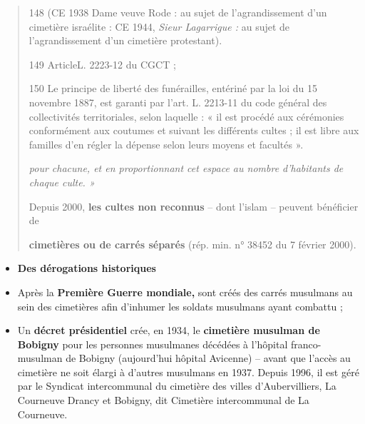 \begin{quote}
148 (CE 1938 Dame veuve Rode : au sujet de l'agrandissement d'un
cimetière israélite : CE 1944, \emph{Sieur Lagarrigue :} au sujet de
l'agrandissement d'un cimetière protestant).

149 ArticleL. 2223-12 du CGCT ;

150 Le principe de liberté des funérailles, entériné par la loi du 15
novembre 1887, est garanti par l'art. L. 2213-11 du code général des
collectivités territoriales, selon laquelle : « il est procédé aux
cérémonies conformément aux coutumes et suivant les différents cultes ;
il est libre aux familles d'en régler la dépense selon leurs moyens et
facultés ».



\emph{pour chacune, et en proportionnant cet espace au nombre
d'habitants de chaque culte. »}

Depuis 2000, \textbf{les cultes non reconnus} -- dont l'islam -- peuvent
bénéficier de

\textbf{cimetières ou de carrés séparés} (rép. min. n° 38452 du 7
février 2000).
\end{quote}

\begin{itemize}
\item
  \textbf{Des dérogations historiques}
\end{itemize}

\begin{itemize}
\item
  Après la \textbf{Première Guerre mondiale,} sont créés des carrés
  musulmans au sein des cimetières afin d'inhumer les soldats musulmans
  ayant combattu ;
\item
  Un \textbf{décret présidentiel} crée, en 1934, le \textbf{cimetière
  musulman de Bobigny} pour les personnes musulmanes décédées à
  l'hôpital franco-musulman de Bobigny (aujourd'hui hôpital Avicenne) --
  avant que l'accès au cimetière ne soit élargi à d'autres musulmans en
  1937. Depuis 1996, il est géré par le Syndicat intercommunal du
  cimetière des villes d'Aubervilliers, La Courneuve Drancy et Bobigny,
  dit Cimetière intercommunal de La Courneuve.
\end{itemize}

